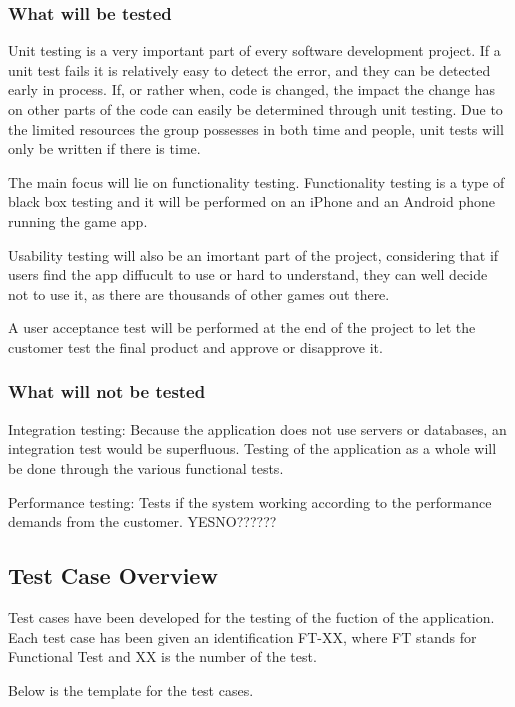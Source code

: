 \subsubsection{What will be tested}

Unit testing is a very important part of every software development project. If a unit test fails it is relatively easy to detect the error, and they can be detected early in process. If, or rather when, code is changed, the impact the change has on other parts of the code can easily be determined through unit testing. Due to the limited resources
the group possesses in both time and people, unit tests will only be written if there is time. 

The main focus will lie on functionality testing. Functionality testing is a type of black box testing and it will be performed on an iPhone and an Android phone running the game app.

Usability testing will also be an imortant part of the project, considering that if users find the app diffucult to use or hard to understand, they can well decide not to use it, as there are thousands of other games out there.

A user acceptance test will be performed at the end of the project to let the customer test the final product and
approve or disapprove it.

\subsubsection{What will not be tested}


Integration testing: Because the application does not use servers or databases, an integration test would be superfluous. Testing of the application as a whole will be done through the various functional tests.

Performance testing: Tests if the system working according to the performance demands from the customer. YESNO??????

\subsection{Test Case Overview}

Test cases have been developed for the testing of the fuction of the application. Each test case has been given an identification FT-XX, where FT stands for Functional Test and XX is the number of the test.

Below is the template for the test cases.

